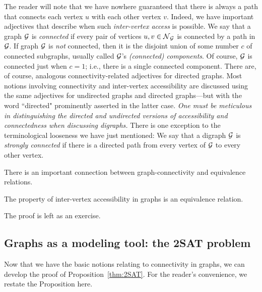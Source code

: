 The reader will note that we have nowhere guaranteed that there is always a
path that connects each vertex $u$ with each other vertex $v$.  Indeed, we have
important adjectives that describe when such {\em inter-vertex access} is possible.
We say that a graph $\mbox{$\cal G$}$ is {\it connected} if every pair of vertices $u, v \in \mbox{$\cal N$}_{\mbox{{\scriptsize $\cal G$}}}$
is connected by a path in $\mbox{$\cal G$}$.  If graph $\mbox{$\cal G$}$ is {\em not} connected, then it is the
disjoint union of some number $c$ of connected subgraphs, usually called $\mbox{$\cal G$}$'s
{\it (connected) components}.  Of course, $\mbox{$\cal G$}$ is connected just when $c=1$; i.e., 
there is a single connected component.  There are, of course, analogous connectivity-related
adjectives for directed graphs.  Most notions involving connectivity and inter-vertex
accessibility are discussed using the same adjectives for undirected graphs and directed
graphs---but with the word ``directed" prominently asserted in the latter case.
{\em One must be meticulous in distinguishing the directed and undirected versions of
accessibility and connectedness when discussing digraphs.}  There is one exception to
the terminological looseness we have just mentioned: We say that a digraph $\mbox{$\cal G$}$ is
{\it strongly connected} if there is a directed path from every vertex of $\mbox{$\cal G$}$ to every
other vertex.

There is an important connection between graph-connectivity and equivalence relations.

\begin{prop}
\label{thm:Accessibility-Equivalence}
The property of inter-vertex accessibility in graphs is an equivalence relation.
\end{prop}

The proof is left as an exercise.


\subsection{Graphs as a modeling tool: the {\sf 2SAT} problem}
\label{sec:graph-model-2SAT}

Now that we have the basic notions relating to connectivity in graphs,
we can develop the proof of Proposition~\ref{thm:2SAT}.  For the
reader's convenience, we restate the Proposition here.


